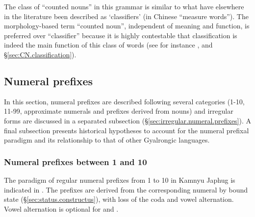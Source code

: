 The class of ``counted nouns'' in this grammar is similar to what have elsewhere in the literature been described as `classifiers' (in Chinese   ``measure words''). The morphology-based term ``counted noun'', independent of meaning and function, is preferred over ``classifier'' because it is highly contestable that classification is indeed the main function of this class of words (see for instance  \citealt{francois99classificateurs}, and §\ref{sec:CN.classification}). 

\subsection{Numeral prefixes} \label{sec:numeral.prefixes}
In this section, numeral prefixes are described following several categories (1-10, 11-99, approximate numerals and prefixes derived from nouns) and irregular forms are discussed in a separated subsection (§\ref{sec:irregular.numeral.prefixes}). A final subsection presents historical hypotheses to account for the numeral prefixal paradigm and its relationship to that of other Gyalrongic languages.



\subsubsection{Numeral prefixes between 1 and 10} \label{sec:num.prefixes.1.10}
The paradigm of regular numeral prefixes from 1 to 10 in Kamnyu Japhug is indicated in . The prefixes are derived from the corresponding numeral by bound state (§\ref{sec:status.constructus}), with loss of the coda and vowel alternation. Vowel alternation is optional for  and  . 

%


